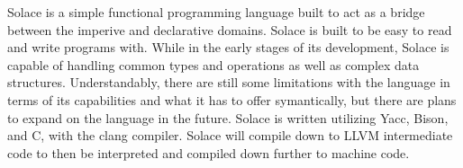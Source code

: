 \documentclass{article}
\begin{document}
Solace is a simple functional programming language built to act as a bridge between the imperive and declarative domains. Solace is built to be easy to read and write programs with. While
in the early stages of its development, Solace is capable of handling common types and operations as well as complex data structures. Understandably, there are still some limitations
with the language in terms of its capabilities and what it has to offer symantically, but there are plans to expand on the language in the future.
Solace is written utilizing Yacc, Bison, and C, with the clang compiler. Solace will compile down to LLVM intermediate code to then be interpreted and compiled down further
to machine code.
\end{document}
